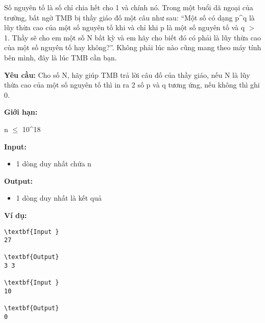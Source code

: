 

Số nguyên tố là số chỉ chia hết cho 1 và chính nó. Trong một buổi dã ngoại của trường, bất ngờ TMB bị thầy giáo đố một câu như sau: “Một số có dạng p^q là lũy thừa cao của một số nguyên tố khi và chỉ khi p là một số nguyên tố và q $>$ 1. Thầy sẽ cho em một số N bất kỳ và em hãy cho biết đó có phải là lũy thừa cao của một số nguyên tố hay không?”. Không phải lúc nào cũng mang theo máy tính bên mình, đây là lúc TMB cần bạn.

\textbf{Yêu cầu: } Cho số N, hãy giúp TMB trả lời câu đố của thầy giáo, nếu N là lũy thừa cao của một số nguyên tố thì in ra 2 số p và q tương ứng, nếu không thì ghi 0.

\textbf{Giới hạn: }

n  $\le$  10^18

\textbf{Input: }
\begin{itemize}
	\item 

1 dòng duy nhất chứa n
\end{itemize}

\textbf{Output: }
\begin{itemize}
	\item 

1 dòng duy nhất là kết quả
\end{itemize}

\textbf{Ví dụ: }
\begin{verbatim}
\textbf{Input }
27

\textbf{Output}
3 3

\textbf{Input }
10

\textbf{Output}
0\end{verbatim}
